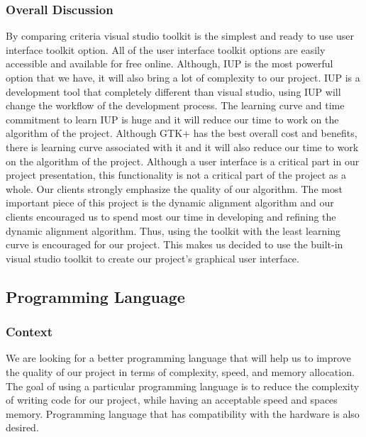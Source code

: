 \subsubsection{Overall Discussion}
By comparing criteria visual studio toolkit is the simplest and ready to use user interface toolkit option.
All of the user interface toolkit options are easily accessible and available for free online.
Although, IUP is the most powerful option that we have, it will also bring a lot of complexity to our project.
IUP is a development tool that completely different than visual studio, using IUP will change the workflow of the development process.
The learning curve and time commitment to learn IUP is huge and it will reduce our time to work on the algorithm of the project.
Although GTK+ has the best overall cost and benefits, there is learning curve associated with it and it will also reduce our time to work on the algorithm of the project.
Although a user interface is a critical part in our project presentation, this functionality is not a critical part of the project as a whole.
Our clients strongly emphasize the quality of our algorithm.
The most important piece of this project is the dynamic alignment algorithm and our clients encouraged us to spend most our time in developing and refining the dynamic alignment algorithm.
Thus, using the toolkit with the least learning curve is encouraged for our project.
This makes us decided to use the built-in visual studio toolkit to create our project’s graphical user interface. 



\subsection{Programming Language}
\subsubsection{Context}
We are looking for a better programming language that will help us to improve the quality of our project in terms of complexity, speed, and memory allocation.
The goal of using a particular programming language is to reduce the complexity of writing code for our project, while having an acceptable speed and spaces memory.
Programming language that has compatibility with the hardware is also desired.\\

